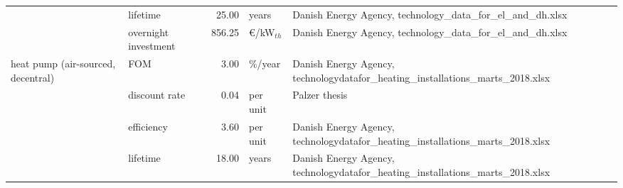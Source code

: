 \begin{longtable}{p{4cm}p{4cm}rp{3cm}p{10cm}}
                      & lifetime &        25.00 &                         years &                                                                                                                                                                                                                                                                        Danish Energy Agency, technology\_data\_for\_el\_and\_dh.xlsx \\
                      & overnight investment &       856.25 &               \euro/kW$_{th}$ &                                                                                                                                                                                                                                                                        Danish Energy Agency, technology\_data\_for\_el\_and\_dh.xlsx \\
heat pump (air-sourced, decentral) & FOM &         3.00 &                       \%/year &                                                                                                                                                                                                                                                    Danish Energy Agency, technologydatafor\_heating\_installations\_marts\_2018.xlsx \\
                      & discount rate &         0.04 &                      per unit &                                                                                                                                                                                                                                                                                                                        Palzer thesis \\
                      & efficiency &         3.60 &                      per unit &                                                                                                                                                                                                                                                    Danish Energy Agency, technologydatafor\_heating\_installations\_marts\_2018.xlsx \\
                      & lifetime &        18.00 &                         years &                                                                                                                                                                                                                                                    Danish Energy Agency, technologydatafor\_heating\_installations\_marts\_2018.xlsx \\

\end{longtable}
